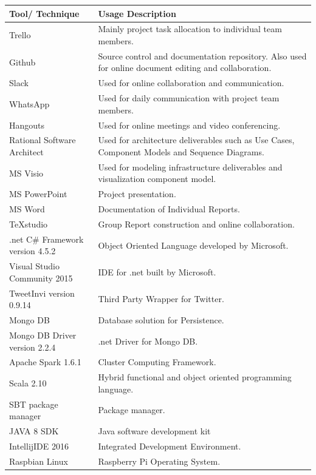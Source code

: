 \documentclass[12pt]{article} %
\begin{document}
	 \begin{center}
	 	\begin{tabular}{ | p{3.5cm} | p{12cm} |}
	 		\hline
	 		\textbf{Tool/ Technique} & \textbf{Usage Description} \\
	 		\hline
	 		Trello & Mainly project task allocation to individual team members.\\
	 		\hline
	 		Github & Source control and documentation repository. Also used for online document editing and collaboration.\\
	 		\hline
	 		Slack & Used for online collaboration and communication.\\
	 		\hline
	 		WhatsApp & Used for daily communication with project team members.\\
	 		\hline
	 		Hangouts & Used for online meetings and video conferencing.\\
	 		\hline
	 		Rational Software Architect & Used for architecture deliverables such as Use Cases, Component Models and Sequence Diagrams.\\
	 		\hline
	 		MS Visio & Used for modeling infrastructure deliverables and visualization component model.\\
	 		\hline
	 		MS PowerPoint & Project presentation.\\
	 		\hline
		 	MS Word & Documentation of Individual Reports.\\
		 	\hline
		 	TeXstudio & Group Report construction and online collaboration.\\
		 	\hline
		 	.net C\# Framework version 4.5.2 & Object Oriented Language developed by Microsoft.\\
		 	\hline
		 	Visual Studio Community 2015 & IDE for .net built by Microsoft.\\
		 	\hline
		 	TweetInvi version 0.9.14 & Third Party Wrapper for Twitter.\\
		 	\hline
		 	Mongo DB & Database solution for Persistence.\\
		 	\hline
		 	Mongo DB Driver version 2.2.4 & .net Driver for Mongo DB.\\
		 	\hline
		 	Apache Spark 1.6.1 & Cluster Computing Framework. \\
		 	\hline
		 	Scala 2.10 & Hybrid functional and object oriented programming language.\\
		 	\hline
		 	SBT package manager & Package manager.\\
		 	\hline
		 	JAVA 8 SDK & Java software development kit\\
		 	\hline
		 	IntellijIDE 2016 & Integrated Development Environment.\\
		 	\hline
		 	Raspbian Linux & Raspberry Pi Operating System.\\
		 	\hline
		 
	 	\end{tabular}
	 \end{center}
	 
\end{document}
